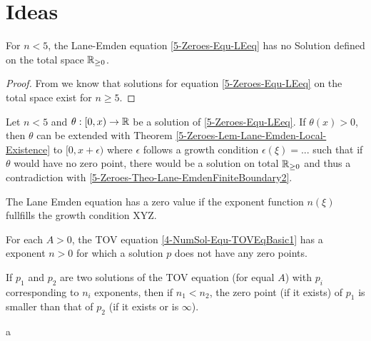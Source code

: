 \section{Ideas}

%
%
%
\begin{theorem}
	\label{5-Zeroes-Theo-Lane-EmdenFiniteBoundary2}
	For $n<5$, the Lane-Emden equation \ref{5-Zeroes-Equ-LEeq} has no Solution defined on the total space $\mathbb{R}_{\geq0}$.
\end{theorem}
\begin{proof}
	From \cite{quittnerSuperlinearParabolicProblems2007} we know that solutions for equation \ref{5-Zeroes-Equ-LEeq} on the total space exist for $n\geq5$.
	
\end{proof}
%
%
%
\begin{theorem}
	\label{5-Zeroes-Theo-Lane-EmdenFiniteBoundary3}
	Let $n<5$ and $\theta:[0,x)\rightarrow\mathbb{R}$ be a solution of \ref{5-Zeroes-Equ-LEeq}. If $\theta(x)>0$, then $\theta$ can be extended with Theorem \ref{5-Zeroes-Lem-Lane-Emden-Local-Existence}
	to $[0,x+\epsilon)$ where $\epsilon$ follows a growth condition $\epsilon(\xi)=...$ such that if $\theta$ would have no zero point, there would be a solution on total 
	$\mathbb{R}_{\geq0}$ and thus a contradiction with \ref{5-Zeroes-Theo-Lane-EmdenFiniteBoundary2}.
\end{theorem}
\begin{theorem}
	The Lane Emden equation has a zero value if the exponent function $n(\xi)$ fullfills the growth condition XYZ.
\end{theorem}


\begin{theorem}
	For each $A>0$, the TOV equation \ref{4-NumSol-Equ-TOVEqBasic1} has a exponent $n>0$ for which a solution $p$ does not have any zero points.
\end{theorem}
\begin{theorem}
	If $p_1$ and $p_2$ are two solutions of the TOV equation (for equal $A$) with $p_i$ corresponding to $n_i$ exponents, then if $n_1<n_2$, the zero 
	point (if it exists) of $p_1$ is smaller than that of $p_2$ (if it exists or is $\infty$).
\end{theorem}
\begin{theorem}
	a 
\end{theorem}




